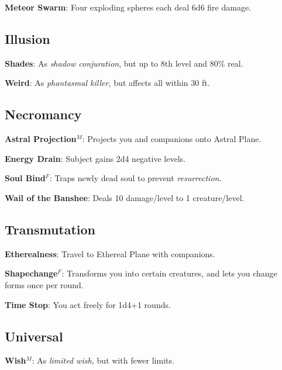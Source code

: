 \textbf{Meteor Swarm}: Four exploding spheres each deal 6d6 fire damage.

\subsection{Illusion}


\textbf{Shades}: As \textit{shadow conjuration}, but up to 8th level and 80\% real.

\textbf{Weird}: As \textit{phantasmal killer, }but affects all within 30 ft.

\subsection{Necromancy}


\textbf{Astral Projection}\(^{M}\): Projects you and companions onto Astral Plane.

\textbf{Energy Drain}: Subject gains 2d4 negative levels.

\textbf{Soul Bind}\(^{F}\): Traps newly dead soul to prevent \textit{resurrection}.

\textbf{Wail of the Banshee}: Deals 10 damage/level to 1 creature/level.

\subsection{Transmutation}


\textbf{Etherealness}: Travel to Ethereal Plane with companions.

\textbf{Shapechange}\(^{F}\): Transforms you into certain creatures, and lets you change forms once per round.

\textbf{Time Stop}: You act freely for 1d4+1 rounds.

\subsection{Universal}


\textbf{Wish}\(^{M}\): As \textit{limited wish, }but with fewer limits.
        
